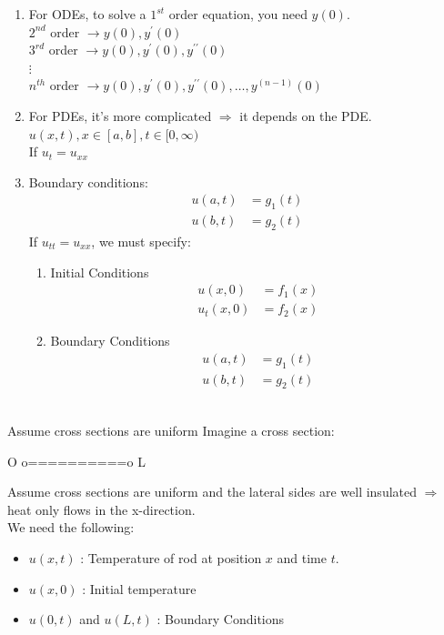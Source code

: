\documentclass{article}
\begin{document}
\begin{enumerate}
  \item For ODEs, to solve a $1^{st}$ order equation, you need $y(0)$.\\
  $2^{nd}$ order $\rightarrow y(0), y^\prime(0)$\\
  $3^{rd}$ order $\rightarrow y(0), y^\prime(0), y^{\prime\prime}(0)$\\
  $\vdots$\\
  $n^{th}$ order $\rightarrow y(0), y^\prime(0), y^{\prime\prime}(0), \ldots, y^{(n - 1)}(0)$
  \item For PDEs, it's more complicated $\Rightarrow$ it depends on the PDE.\\
  \Ex $u(x, t), x \in [a, b], t \in [0, \infty)$\\
  If $u_t = u_{xx}$
  \item Boundary conditions:
  \begin{align}
    u(a, t) & = g_1(t)\\
    u(b, t) & = g_2(t)
  \end{align}
  If $u_{tt} = u_{xx}$, we must specify:
  \begin{enumerate}
    \item Initial Conditions
    \begin{align}
      u(x, 0) & = f_1(x)\\
      u_t(x, 0) & = f_2(x)
    \end{align}
    \item Boundary Conditions
    \begin{align}
      u(a, t) & = g_1(t)\\
      u(b, t) & = g_2(t)
    \end{align}
  \end{enumerate}
\end{enumerate}
\\
Assume cross sections are uniform
Imagine a cross section:
\begin{center}
  O o==========o L
\end{center}
Assume cross sections are uniform and the lateral sides are well insulated $\Rightarrow$ heat only flows in the x-direction.\\
We need the following:
\begin{itemize}
  \item $u(x, t)$ : Temperature of rod at position $x$ and time $t$.
  \item $u(x, 0)$ : Initial temperature
  \item $u(0, t)$ and $u(L, t)$ : Boundary Conditions
\end{itemize}
\end{document}
